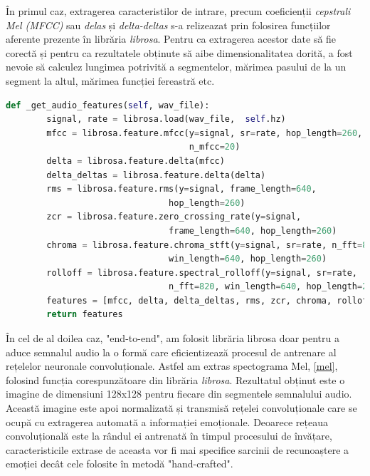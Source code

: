 \documentclass[a4paper,12pt]{book}
\begin{document}
				În primul caz, extragerea caracteristilor de intrare, precum coeficienții \textit{cepstrali Mel (MFCC)} sau \textit{delas} și \textit{delta-deltas} s-a relizeazat prin folosirea funcțiilor aferente prezente în librăria \textit{librosa}. Pentru ca extragerea acestor date să fie corectă și pentru ca rezultatele obținute să aibe dimensionalitatea dorită, a fost nevoie să calculez lungimea potrivită a segmentelor, mărimea pasului de la un segment la altul, mărimea funcției fereastră etc. \par
				
				\begin{lstlisting}[language=Python, caption={Extragerea caracteristicilor "hand-crafted", 3.3, folosind librăria librosa.}, xleftmargin=0cm]
 def _get_audio_features(self, wav_file):
		signal, rate = librosa.load(wav_file,  self.hz)
		mfcc = librosa.feature.mfcc(y=signal, sr=rate, hop_length=260, 
									n_mfcc=20)
		delta = librosa.feature.delta(mfcc)
		delta_deltas = librosa.feature.delta(delta)
		rms = librosa.feature.rms(y=signal, frame_length=640, 
								hop_length=260)
		zcr = librosa.feature.zero_crossing_rate(y=signal, 
								frame_length=640, hop_length=260)
		chroma = librosa.feature.chroma_stft(y=signal, sr=rate, n_fft=820, 
								win_length=640,	hop_length=260)
		rolloff = librosa.feature.spectral_rolloff(y=signal, sr=rate, 
								n_fft=820, win_length=640, hop_length=260)
		features = [mfcc, delta, delta_deltas, rms, zcr, chroma, rolloff]
		return features	\end{lstlisting}
				
				În cel de al doilea caz, "end-to-end", am folosit librăria librosa doar pentru a aduce semnalul audio la o formă care eficientizează procesul de antrenare al rețelelor neuronale convoluționale. Astfel am extras spectograma Mel, \ref{mel}, folosind funcția corespunzătoare din librăria \textit{librosa}. Rezultatul obținut este o imagine de dimensiuni 128x128 pentru fiecare din segmentele semnalului audio. Această imagine este apoi normalizată și transmisă rețelei convoluționale care se ocupă cu extragerea automată a informației emoționale. Deoarece rețeaua convoluțională este la rândul ei antrenată în timpul procesului de învățare, caracteristicile extrase de aceasta vor fi mai specifice sarcinii de recunoaștere a emoției decât cele folosite în metodă "hand-crafted". \par
				
\end{document}
